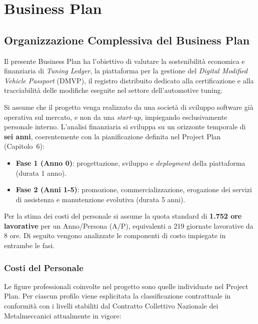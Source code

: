\chapter{Business Plan}

\section{Organizzazione Complessiva del Business Plan}

Il presente Business Plan ha l'obiettivo di valutare la sostenibilità economica e finanziaria di \textit{Tuning Ledger}, la piattaforma per la gestione del \textit{Digital Modified Vehicle Passport} (DMVP), il registro distribuito dedicato alla certificazione e alla tracciabilit\`a delle modifiche eseguite nel settore dell'automotive tuning.

Si assume che il progetto venga realizzato da una societ\`a di sviluppo software gi\`a operativa sul mercato, e non da una \textit{start-up}, impiegando esclusivamente personale interno. L'analisi finanziaria si sviluppa su un orizzonte temporale di \textbf{sei anni}, coerentemente con la pianificazione definita nel Project Plan (Capitolo~6):

\begin{itemize}
    \item \textbf{Fase 1 (Anno 0)}: progettazione, sviluppo e \textit{deployment} della piattaforma (durata 1 anno).
    \item \textbf{Fase 2 (Anni 1-5)}: promozione, commercializzazione, erogazione dei servizi di assistenza e manutenzione evolutiva (durata 5 anni).
\end{itemize}

Per la stima dei costi del personale si assume la quota standard di \textbf{1.752 ore lavorative} per un Anno/Persona (A/P), equivalenti a 219 giornate lavorative da 8 ore. Di seguito vengono analizzate le componenti di costo impiegate in entrambe le fasi.

\subsection{Costi del Personale}

Le figure professionali coinvolte nel progetto sono quelle individuate nel Project Plan. Per ciascun profilo viene esplicitata la classificazione contrattuale in conformit\`a con i livelli stabiliti dal Contratto Collettivo Nazionale dei Metalmeccanici attualmente in vigore:


